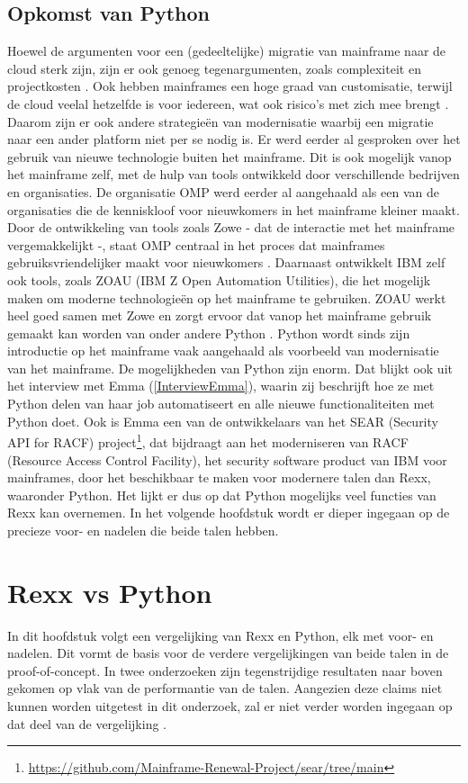 \subsection{Opkomst van Python}
Hoewel de argumenten voor een (gedeeltelijke) migratie van mainframe naar de cloud sterk zijn, zijn er ook genoeg tegenargumenten, zoals complexiteit en projectkosten \autocite{NgoYe2018}. Ook hebben mainframes een hoge graad van customisatie, terwijl de cloud veelal hetzelfde is voor iedereen, wat ook risico’s met zich mee brengt \autocite{Zlatanov2016}. Daarom zijn er ook andere strategieën van modernisatie waarbij een migratie naar een ander platform niet per se nodig is. Er werd eerder al gesproken over het gebruik van nieuwe technologie buiten het mainframe. Dit is ook mogelijk vanop het mainframe zelf, met de hulp van tools ontwikkeld door verschillende bedrijven en organisaties. De organisatie OMP werd eerder al aangehaald als een van de organisaties die de kenniskloof voor nieuwkomers in het mainframe kleiner maakt. Door de ontwikkeling van tools zoals Zowe - dat de interactie met het mainframe vergemakkelijkt -, staat OMP centraal in het proces dat mainframes gebruiksvriendelijker maakt voor nieuwkomers \autocite{Project2025a,Docs2026}. Daarnaast ontwikkelt IBM zelf ook tools, zoals ZOAU (IBM Z Open Automation Utilities), die het mogelijk maken om moderne technologieën op het mainframe te gebruiken. ZOAU werkt heel goed samen met Zowe en zorgt ervoor dat vanop het mainframe gebruik gemaakt kan worden van onder andere Python \autocite{Singh2025}. Python wordt sinds zijn introductie op het mainframe vaak aangehaald als voorbeeld van modernisatie van het mainframe. De mogelijkheden van Python zijn enorm. Dat blijkt ook uit het interview met Emma (\ref{InterviewEmma}), waarin zij beschrijft hoe ze met Python delen van haar job automatiseert en alle nieuwe functionaliteiten met Python doet. Ook is Emma een van de ontwikkelaars van het SEAR (Security API for RACF) project\footnote{\url{https://github.com/Mainframe-Renewal-Project/sear/tree/main}\label{fn:SEARrepo}}, dat bijdraagt aan het moderniseren van RACF (Resource Access Control Facility), het security software product van IBM voor mainframes, door het beschikbaar te maken voor modernere talen dan Rexx, waaronder Python. Het lijkt er dus op dat Python mogelijks veel functies van Rexx kan overnemen. In het volgende hoofdstuk wordt er dieper ingegaan op de precieze voor- en nadelen die beide talen hebben.

\section{Rexx vs Python}
In dit hoofdstuk volgt een vergelijking van Rexx en Python, elk met voor- en nadelen. Dit vormt de basis voor de verdere vergelijkingen van beide talen in de proof-of-concept. In twee onderzoeken zijn tegenstrijdige resultaten naar boven gekomen op vlak van de performantie van de talen. Aangezien deze claims niet kunnen worden uitgetest in dit onderzoek, zal er niet verder worden ingegaan op dat deel van de vergelijking \autocite{Sadavarte2022,Prechelt2000}.

